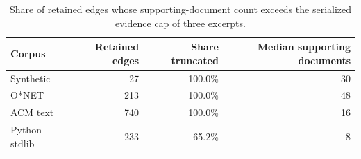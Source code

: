 \begin{table}[t]
  \caption{Share of retained edges whose supporting-document count exceeds the serialized evidence cap of three excerpts.}
  \label{tab:evidence-retention}
  \centering
  \small
  \begin{tabular}{lrrr}
    \toprule
    Corpus & Retained edges & Share truncated & Median supporting documents \\
    \midrule
    Synthetic & 27 & 100.0\% & 30 \\
    O*NET & 213 & 100.0\% & 48 \\
    ACM text & 740 & 100.0\% & 16 \\
    Python stdlib & 233 & 65.2\% & 8 \\
    \bottomrule
  \end{tabular}
\end{table}
